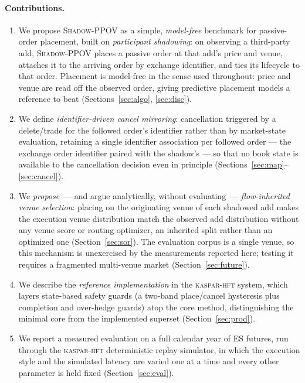 \documentclass[11pt]{article}
\newcommand{\pov}{\textsc{Shadow-PPOV}}
\begin{document}
\paragraph{Contributions.}
\begin{enumerate}[leftmargin=1.6em]
  \item We propose \pov{} as a simple, \emph{model-free} benchmark for
  passive-order placement, built on \emph{participant shadowing}: on observing a
  third-party add, \pov{} places a passive order at that add's price and venue,
  attaches it to the arriving order by exchange identifier, and ties its
  lifecycle to that order. Placement is model-free in the sense used
  throughout: price and venue are read off the observed order, giving predictive
  placement models a reference to beat (Sections~\ref{sec:algo},
  \ref{sec:disc}).
  \item We define \emph{identifier-driven cancel mirroring}: cancellation
  triggered by a delete/trade for the followed order's identifier rather than
  by market-state evaluation, retaining a single identifier association per
  followed order --- the exchange order identifier paired with the shadow's
  --- so that no book state is available to the cancellation decision even in
  principle (Sections~\ref{sec:map}--\ref{sec:cancel}).
  \item We \emph{propose} \,--- and argue analytically, without evaluating
  \,--- \emph{flow-inherited venue selection}: placing on the originating venue
  of each shadowed add makes the execution venue distribution match the observed
  add distribution without any venue score or routing optimizer, an inherited
  split rather than an optimized one (Section~\ref{sec:sor}). The evaluation
  corpus is a single venue, so this mechanism is unexercised by the measurements
  reported here; testing it requires a fragmented multi-venue market
  (Section~\ref{sec:future}).
  \item We describe the \emph{reference implementation} in the
  \textsc{kaspar-hft} system, which layers state-based
  safety guards (a two-band place/cancel hysteresis plus completion and
  over-hedge guards) atop the core method, distinguishing the minimal core from
  the implemented superset (Section~\ref{sec:prod}).
  \item We report a measured evaluation on a full calendar year of ES futures,
  run through the \textsc{kaspar-hft} deterministic replay simulator, in which
  the execution style and the simulated latency are varied one at a time and
  every other parameter is held fixed (Section~\ref{sec:eval}).
\end{enumerate}
\end{document}
